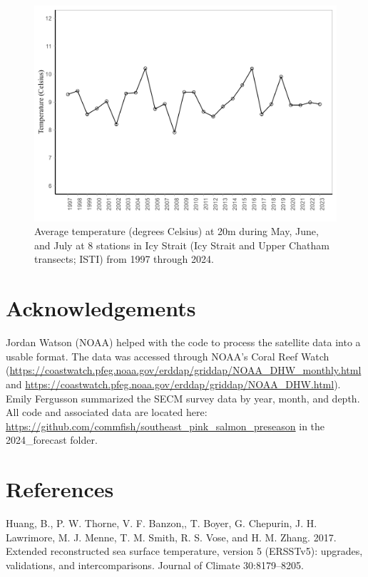 \documentclass[
]{article}
\begin{document}
\begin{figure}
\centering
\includegraphics{../../2024_forecast/results/temperature_data/monthly_SECM_temp_regions.png}
\caption{Average temperature (degrees Celsius) at 20m during May, June,
and July at 8 stations in Icy Strait (Icy Strait and Upper Chatham
transects; ISTI) from 1997 through 2024.}
\end{figure}

\section{Acknowledgements}\label{acknowledgements}

Jordan Watson (NOAA) helped with the code to process the satellite data
into a usable format. The data was accessed through NOAA's Coral Reef
Watch
(\url{https://coastwatch.pfeg.noaa.gov/erddap/griddap/NOAA_DHW_monthly.html}
and
\url{https://coastwatch.pfeg.noaa.gov/erddap/griddap/NOAA_DHW.html}).
Emily Fergusson summarized the SECM survey data by year, month, and
depth. All code and associated data are located here:
\url{https://github.com/commfish/southeast_pink_salmon_preseason} in the
2024\_forecast folder.

\pagebreak

\section{References}\label{references}

Huang, B., P. W. Thorne, V. F. Banzon,, T. Boyer, G. Chepurin, J. H.
Lawrimore, M. J. Menne, T. M. Smith, R. S. Vose, and H. M. Zhang. 2017.
Extended reconstructed sea surface temperature, version 5 (ERSSTv5):
upgrades, validations, and intercomparisons. Journal of Climate
30:8179--8205.
\end{document}
